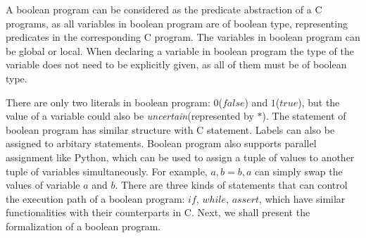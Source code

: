 \documentclass[10pt,journal,final,]{article}
\theoremstyle{definition}
\begin{document}
A boolean program can be considered as the predicate abstraction of a C programs, as all variables in boolean program are of boolean type, representing predicates in the corresponding C program. The variables in boolean program can be global or local.
When declaring a variable in boolean program the type of the variable does not need to be explicitly given, as all of them must be of boolean type.

There are only two literals in boolean program: $0$($false$) and $1$($true$), but the value of a variable could also be {\it uncertain}(represented by $*$).
The statement of boolean program has similar structure with C statement. Labels can also be assigned to arbitary statements.
Boolean program also supports parallel assignment like Python, which can be used to assign a tuple of values to another tuple of variables simultaneously.
For example, $a, b = b, a$ can simply swap the values of variable $a$ and $b$.
There are three kinds of statements that can control the execution path of a boolean program: $if$, $while$, $assert$, which have similar functionalities with their counterparts in C.
Next, we shall present the formalization of a boolean program.
\end{document}

